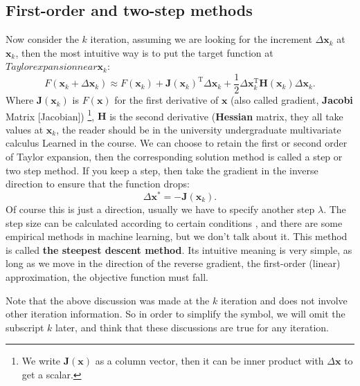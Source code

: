 \subsection{First-order and two-step methods}
Now consider the $k$ iteration, assuming we are looking for the increment $\Delta \bm{x}_k$ at $\bm{x}_k$, then the most intuitive way is to put the target function at $ Taylor expansion near \bm{x}_k$:
\begin{equation}
F(\bm{x}_k+\Delta \bm{x}_k) \approx F{\left( \bm{x}_k \right)} + \bm{J} \left( \bm{x}_k \right) ^\mathrm{T} \Delta \bm{x}_k + \frac{1}{2}\Delta {\bm{x}_k^\mathrm{T}}\bm{H}(\bm{ x}_k) \Delta \bm{x}_k.
\end{equation}
Where $\bm{J}(\bm{x}_k)$ is $F(\bm{x})$ for the first derivative of $\bm{x}$ (also called gradient, \textbf{Jacobi} Matrix [Jacobian]) \footnote{We write $\bm{J}(\bm{x})$ as a column vector, then it can be inner product with $\Delta \bm{x}$ to get a scalar. }, $\bm{H}$ is the second derivative (\textbf{Hessian} matrix, they all take values ​​at $\bm{x}_k$, the reader should be in the university undergraduate multivariate calculus Learned in the course. We can choose to retain the first or second order of Taylor expansion, then the corresponding solution method is called a step or two step method. If you keep a step, then take the gradient in the inverse direction to ensure that the function drops:
\begin{equation}
\Delta \bm{x}^* = - \bm{J}(\bm{x}_k).
\end{equation}
Of course this is just a direction, usually we have to specify another step $\lambda$. The step size can be calculated according to certain conditions \textsuperscript{\cite{Wolfe1969}}, and there are some empirical methods in machine learning, but we don't talk about it. This method is called \textbf{the steepest descent method}. Its intuitive meaning is very simple, as long as we move in the direction of the reverse gradient, the first-order (linear) approximation, the objective function must fall.

Note that the above discussion was made at the $k$ iteration and does not involve other iteration information. So in order to simplify the symbol, we will omit the subscript $k$ later, and think that these discussions are true for any iteration.

